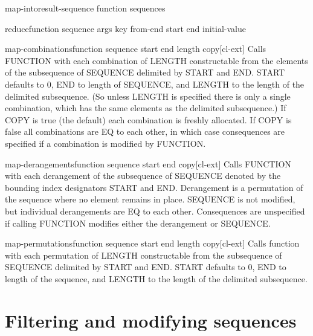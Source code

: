 \documentclass[10pt,english]{book}
\begin{document}
\begin{function}{map-into}{result-sequence function \rest sequences}
  
\end{function}

\begin{function}{reduce}{function sequence \rest args \key key from-end start end initial-value}
  
\end{function}

\begin{function}{map-combinations}{function sequence \key start end length copy}[cl-ext]
  Calls FUNCTION with each combination of LENGTH constructable from the
  elements of the subsequence of SEQUENCE delimited by START and END. START
  defaults to 0, END to length of SEQUENCE, and LENGTH to the length of the
  delimited subsequence. (So unless LENGTH is specified there is only a single
  combination, which has the same elements as the delimited subsequence.) If
  COPY is true (the default) each combination is freshly allocated. If COPY is
  false all combinations are EQ to each other, in which case consequences are
  specified if a combination is modified by FUNCTION.
\end{function}

\begin{function}{map-derangements}{function sequence \key start end copy}[cl-ext]
  Calls FUNCTION with each derangement of the subsequence of SEQUENCE denoted
  by the bounding index designators START and END. Derangement is a permutation
  of the sequence where no element remains in place. SEQUENCE is not modified,
  but individual derangements are EQ to each other. Consequences are unspecified
  if calling FUNCTION modifies either the derangement or SEQUENCE.
\end{function}

\begin{function}{map-permutations}{function sequence \key start end length copy}[cl-ext]
  Calls function with each permutation of LENGTH constructable
  from the subsequence of SEQUENCE delimited by START and END. START
  defaults to 0, END to length of the sequence, and LENGTH to the
  length of the delimited subsequence.
\end{function}

\section{Filtering and modifying sequences}
\label{sec:filt-modify-sequ}
\end{document}

